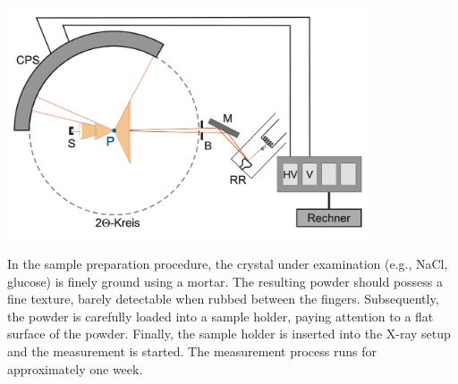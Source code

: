 \begin{center}
    \captionsetup{type = figure}
    \includegraphics[width = 0.8\textwidth]{Pictures/SetupDiff.png}
    \label{fig:setupdiff}
\end{center}

In the sample preparation procedure, the crystal under examination (e.g., NaCl, glucose) is finely ground using a mortar. The resulting powder should possess a fine texture, barely detectable when rubbed between the fingers. Subsequently, the powder is carefully loaded into a sample holder, paying attention to a flat surface of the powder. Finally, the sample holder is inserted into the X-ray setup and the measurement is started. The measurement process runs for
approximately one week.